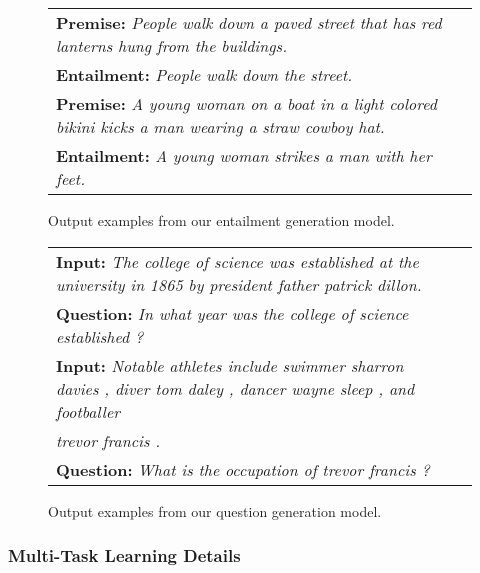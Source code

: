 \documentclass[11pt,a4paper]{article}
\begin{document}
\begin{figure}
\begin{center}
\begin{small}
\begin{tabularx}{\linewidth}{|X|l|}
\hline
\textbf{Premise:} \emph{People walk down a paved street that has red lanterns hung from the buildings.} \\ 
\textbf{Entailment:} \emph{People walk down the street.} \\ 
\hline
\textbf{Premise:} \emph{A young woman on a boat in a light colored bikini kicks a man wearing a straw cowboy hat.}\\
\textbf{Entailment:} \emph{A young woman strikes a man with her feet.} \\ 
\hline
\end{tabularx}
\end{small}
\end{center}
\vspace{-9pt}
\caption{Output examples from our entailment generation model.}
\label{fig:entailment_examples}
\end{figure}

\begin{figure}[t]
\begin{center}
\begin{small}
\begin{tabularx}{\linewidth}{|X|l|}
\hline
\textbf{Input:} \emph{The college of science was established at the university in 1865 by president father patrick dillon.}\\ 
\textbf{Question:} \emph{In what year was the college of science established ?}\\
\hline
\textbf{Input:} \emph{Notable athletes include swimmer sharron davies , diver tom daley , dancer wayne sleep , and footballer}\\
\emph{trevor francis .} \\ 
\textbf{Question:} \emph{What is the occupation of trevor francis ? } \\ 
\hline
\end{tabularx}
\end{small}
\end{center}
\vspace{-9pt}
\caption{Output examples from our question generation model.}
\label{fig:question_examples}
\end{figure}
\subsubsection{Multi-Task Learning Details}
\end{document}
